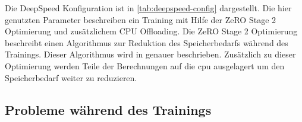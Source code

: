 Die DeepSpeed Konfiguration ist in \cref{tab:deepspeed-config} dargestellt.
Die hier genutzten Parameter beschreiben ein Training mit Hilfe der ZeRO Stage 2 Optimierung und zusätzlichem CPU Offloading.
Die ZeRO Stage 2 Optimierung beschreibt einen Algorithmus zur Reduktion des Speicherbedarfs während des Trainings. Dieser Algorithmus wird in \citet{deepspeed} genauer beschrieben.
Zusätzlich zu dieser Optimierung werden Teile der Berechnungen auf die \ac{cpu} ausgelagert um den Speicherbedarf weiter zu reduzieren.\\


\subsection{Probleme während des Trainings}\label{sec:problem-training}




%
